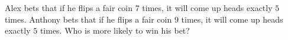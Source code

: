 Alex bets that if he flips a fair coin $7$ times, it will come up heads exactly $5$ times. Anthony bets that if he flips a fair coin $9$ times, it will come up heads exactly $5$ times. Who is more likely to win his bet?
